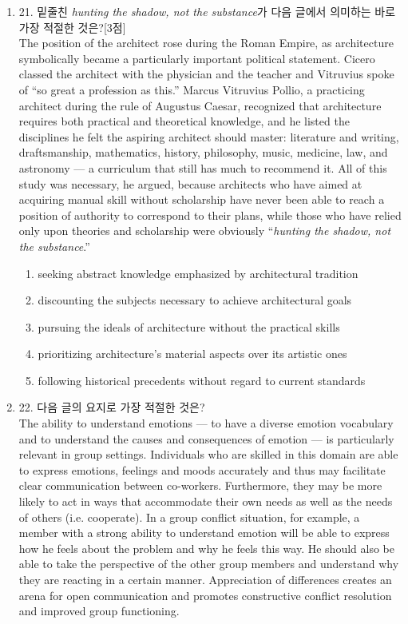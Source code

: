 \documentclass{article}
\begin{document}
\begin{enumerate}[label=\textbf{Q\arabic*.}]
\item
21. 밑줄친 \emph{hunting the shadow, not the substance}가 다음 글에서
의미하는 바로 가장 적절한 것은?[3점]
\\
The position of the architect rose during the Roman Empire, as architecture
symbolically became a particularly important political statement. Cicero
classed the architect with the physician and the teacher and Vitruvius
spoke of “so great a profession as this.” Marcus Vitruvius Pollio, a
practicing architect during the rule of Augustus Caesar, recognized that
architecture requires both practical and theoretical knowledge, and he
listed the disciplines he felt the aspiring architect should master:
literature and writing, draftsmanship, mathematics, history, philosophy,
music, medicine, law, and astronomy — a curriculum that still has much to
recommend it. All of this study was necessary, he argued, because
architects who have aimed at acquiring manual skill without scholarship
have never been able to reach a position of authority to correspond to their
plans, while those who have relied only upon theories and scholarship were
obviously “\emph{hunting the shadow, not the substance}.”

\begin{enumerate}
  \item seeking abstract knowledge emphasized by architectural tradition
  \item discounting the subjects necessary to achieve architectural goals
  \item pursuing the ideals of architecture without the practical skills
  \item prioritizing architecture’s material aspects over its artistic ones
  \item following historical precedents without regard to current standards
\end{enumerate}

\item
22. 다음 글의 요지로 가장 적절한 것은?
\\
The ability to understand emotions — to have a diverse emotion vocabulary
and to understand the causes and consequences of emotion — is particularly
relevant in group settings. Individuals who are skilled in this domain are
able to express emotions, feelings and moods accurately and thus may
facilitate clear communication between co-workers. Furthermore, they may
be more likely to act in ways that accommodate their own needs as well as
the needs of others (i.e. cooperate). In a group conflict situation, for
example, a member with a strong ability to understand emotion will be able
to express how he feels about the problem and why he feels this way. He
should also be able to take the perspective of the other group members and
understand why they are reacting in a certain manner. Appreciation of
differences creates an arena for open communication and promotes
constructive conflict resolution and improved group functioning.


\end{enumerate}
\end{document}
